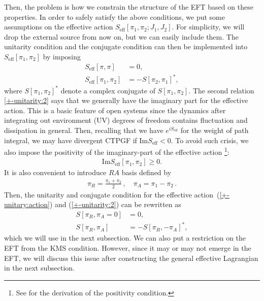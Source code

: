 \documentclass[a4paper,11pt]{article}
\begin{document}
\medskip
Then, the problem is how we constrain the structure of the EFT 
based on these properties. 
In order to safely satisfy the above conditions, we put some assumptions 
on the effective action $S_{\mathrm{eff}} [\pi_1,\pi_2;J_1,J_2]$. 
For simplicity, we will drop the external source from now on, but 
we can easily include them. 
The unitarity condition and the conjugate condition can then be implemented 
into $S_{\mathrm{eff}} [\pi_1,\pi_2]$ by imposing
\begin{align}
 S_{\mathrm{eff}} [\pi,\pi] &=0 ,\label{+-unitary:action}
 \\
 S_{\mathrm{eff}} [\pi_1,\pi_2]& = -S[\pi_2,\pi_1]^*,
\label{+-unitarity:2}
\end{align}
where $S[\pi_1,\pi_2]^*$ denote a complex conjugate of $S[\pi_1,\pi_2]$.
The second relation \eqref{+-unitarity:2} says that 
we generally have the imaginary part for the effective action. 
This is a basic feature of open systems since the dynamics after integrating 
out environment (UV) degrees of freedom contains fluctuation and dissipation 
in general.
Then, recalling that we have $e^{iS_{\mathrm{eff}}}$ for the weight of 
path integral, we may have divergent CTPGF 
if $\mathrm{Im} S_{\mathrm{eff}} < 0$.
To avoid such crisis, we also impose the positivity of the imaginary-part 
of the effective action%
\footnote{
See \cite{Glorioso:2016gsa} for the derivation of the positivity condition.
}:
\begin{align}
 \mathrm{Im} S_{\mathrm{eff}} [\pi_1,\pi_2] \geq 0.\label{unitary:open}
\end{align}
It is also convenient to introduce $RA$ basis 
defined by
\begin{align}
 \pi_R = \frac{\pi_1 + \pi_2}{2}\,,
 \quad
 \pi_A=\pi_1-\pi_2\,.
\label{def:RAbasis}
\end{align}
Then, the unitarity and conjugate condition 
for the effective action~(\ref{+-unitary:action}) and (\ref{+-unitarity:2}) 
can be rewritten as
\begin{align}
S[\pi_{R},\pi_{A}=0]&=0,\label{unitary:action}
\\
S[\pi_{R},\pi_{A}]&=-S [\pi_{R},-\pi_{A}]^*,
\label{unitarity:2}
\end{align}
which we will use in the next subsection.
We can also put a restriction on the EFT from the KMS condition.
However, since it may or may not emerge in the EFT, we will 
discuss this issue after constructing the general effective Lagrangian 
in the next subsection. 
\end{document}
